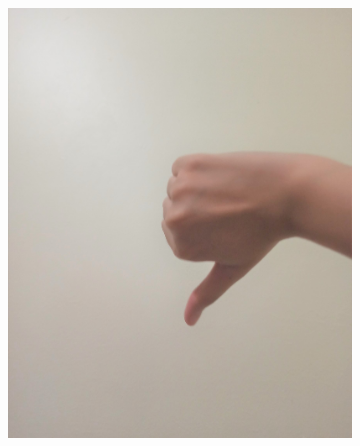 \documentclass[conference]{IEEEtran}
\begin{document}
\begin{figure} [h]
\begin{center}
\begin{subfigure}[t]{0.11\textwidth}
			\includegraphics[width=\textwidth]{img/pola8b.jpg}
			\caption{\label{fig:gs8b}}
		\end{subfigure}
		\hspace{0.1em}
		\begin{subfigure}[t]{0.11\textwidth}
			\centering

\end{subfigure}
\end{center}
\end{figure}
\end{document}
